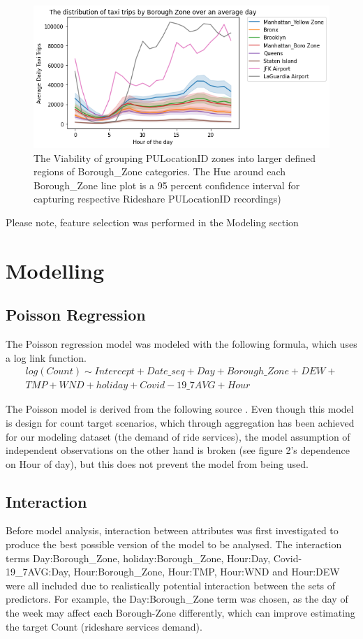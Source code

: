 \documentclass[11pt]{article}
\begin{document}
\begin{figure}[h]
    \centering
    \includegraphics[width=12cm]{plots/Borough_Zone_Distribution.png}
    \caption{The Viability of grouping PULocationID zones into larger defined regions of Borough\_Zone categories. The Hue around each Borough\_Zone line plot is a 95 percent confidence interval for capturing respective Rideshare PULocationID recordings)}
\end{figure}

Please note, feature selection was performed in the Modeling section

\section{Modelling}
\subsection{Poisson Regression}
The Poisson regression model was modeled with the following formula, which uses a log link function.
\begin{align*}
    \tag{Model 1}
        log(Count) \sim Intercept + Date\_seq + Day + Borough\_Zone + DEW + \\TMP                 + WND + holiday + Covid-19\_7AVG + Hour
\end{align*}

The Poisson model is derived from the following source \cite{model_pois}. Even though this model is design for count target scenarios, which through aggregation has been achieved for our modeling dataset (the demand of ride services), the model assumption of independent observations on the other hand is broken (see figure 2's dependence on Hour of day), but this does not prevent the model from being used. 

\subsection{Interaction} 
Before model analysis, interaction between attributes was first investigated to produce the best possible version of the model to be analysed. The interaction terms Day:Borough\_Zone, holiday:Borough\_Zone, Hour:Day,  Covid-19\_7AVG:Day, 
Hour:Borough\_Zone, Hour:TMP, Hour:WND and Hour:DEW were all included due to realistically potential interaction between the sets of predictors. For example, the Day:Borough\_Zone term was chosen, as the day of the week may affect each Borough-Zone differently, which can improve estimating the target Count (rideshare services demand).
\end{document}
